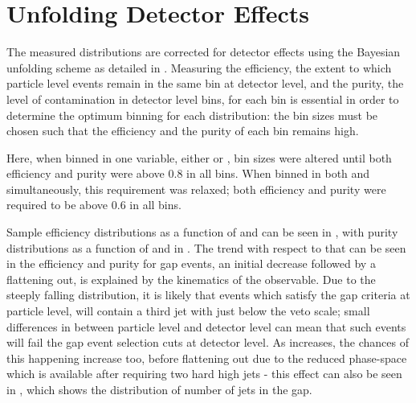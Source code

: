 \section{Unfolding Detector Effects}
The measured distributions are corrected for detector effects using the Bayesian
unfolding scheme as detailed in . Measuring
the efficiency, the extent to which particle level events remain in the same bin
at detector level, and the purity, the level of contamination in detector level bins,
for each bin is essential in order to determine the optimum binning for each distribution:
the bin sizes must be chosen such that the efficiency and the purity of each bin
remains high.

Here, when binned in one variable, either \DeltaY or \DeltaPhi, bin sizes were
altered until both efficiency and purity were above 0.8 in all bins. When binned
in both \DeltaY and \DeltaPhi simultaneously, this requirement was relaxed; both
efficiency and purity were required to be above 0.6 in all bins.

Sample efficiency distributions as a function of \DeltaY and \DeltaPhi can be
seen in , with purity
distributions as a function of \DeltaY and \DeltaPhi in .
The trend with respect to \DeltaY that can be seen in the efficiency and purity for gap events, an initial decrease
followed by a flattening out, is explained by the kinematics of the observable.
Due to the steeply falling \pTthree distribution, it is likely that events which
satisfy the gap criteria at particle level, will contain a third jet with \pTthree
just below the veto scale; small differences in \pT between particle level and detector
level can mean that such events will fail the gap event selection cuts at detector
level. As \DeltaY increases, the chances of this happening increase too, before
flattening out due to the reduced phase-space which is available after requiring 
two hard high \rap jets - this effect can also be seen in ,
which shows the distribution of number of jets in the gap.

